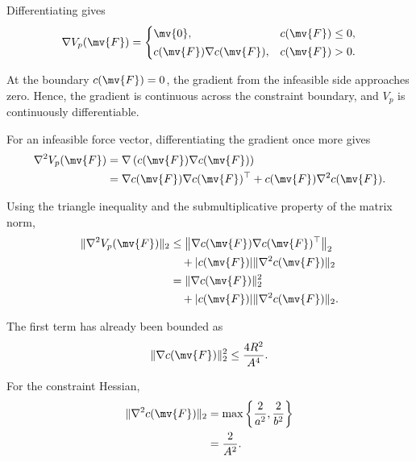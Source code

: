 Differentiating gives
\begin{equation}
	\nabla V_p(\mv{F})
	=
	\begin{cases}
		\mv{0},
		 & c(\mv{F})\leq0
		,
		\\[2pt]
		c(\mv{F})\nabla c(\mv{F}),
		 & c(\mv{F})>0
		.
	\end{cases}
\end{equation}

At the boundary $c(\mv{F})=0$, the gradient from the infeasible side approaches
zero. Hence, the gradient is continuous across the constraint boundary, and
$V_p$ is continuously differentiable.

For an infeasible force vector, differentiating the gradient once more gives
\begin{equation}
	\begin{aligned}
		\nabla^2 V_p(\mv{F})
		 & =
		\nabla
		\left(
		c(\mv{F})
		\nabla c(\mv{F})
		\right)
		\\
		 & =
		\nabla c(\mv{F})
		\nabla c(\mv{F})^\top
		+
		c(\mv{F})
		\nabla^2 c(\mv{F})
		.
	\end{aligned}
\end{equation}

Using the triangle inequality and the submultiplicative property of the matrix
norm,
\begin{equation}
	\begin{aligned}
		\|\nabla^2 V_p(\mv{F})\|_2
		 & \leq
		\left\|
		\nabla c(\mv{F})
		\nabla c(\mv{F})^\top
		\right\|_2
		\\
		 & \quad+
		|c(\mv{F})|
		\|\nabla^2 c(\mv{F})\|_2
		\\
		 & =
		\|\nabla c(\mv{F})\|_2^2
		\\
		 & \quad+
		|c(\mv{F})|
		\|\nabla^2 c(\mv{F})\|_2
		.
	\end{aligned}
\end{equation}

The first term has already been bounded as
\begin{equation}
	\|\nabla c(\mv{F})\|_2^2
	\leq
	\frac{4R^2}{A^4}
	.
\end{equation}

For the constraint Hessian,
\begin{equation}
	\begin{aligned}
		\|\nabla^2 c(\mv{F})\|_2
		 & =
		\max
		\left\{
		\frac{2}{a^2},
		\frac{2}{b^2}
		\right\}
		\\
		 & =
		\frac{2}{A^2}
		.
	\end{aligned}
\end{equation}

